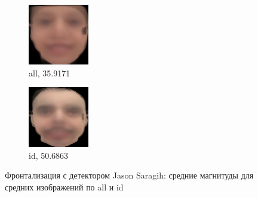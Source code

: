 \begin{figure}[b]
\centering
	\begin{subfigure}[t]{0.3\textwidth}
		\includegraphics[width=\textwidth]{results/all_myfront_mean.png}
		\caption{all, 35.9171}
	\end{subfigure}
	\begin{subfigure}[t]{0.3\textwidth}
		\includegraphics[width=\textwidth]{results/id2_myfront_mean.png}
		\caption{id, 50.6863}
	\end{subfigure}
	\caption{Фронтализация с детектором Jason Saragih: средние магнитуды для средних изображений по all и id}
	\label{fig:exp_js}
\end{figure}

